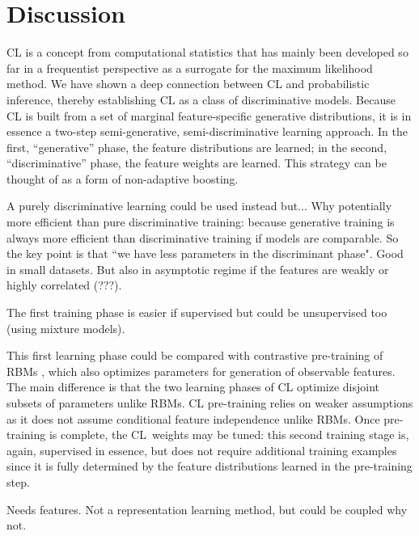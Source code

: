 \documentclass[english]{scrartcl}
\begin{document}
\section{Discussion}
\label{sec:discussion}

CL is a concept from computational statistics that has mainly been developed so far in a frequentist perspective as a surrogate for the maximum likelihood method. We have shown a deep connection between CL and probabilistic inference, thereby establishing CL as a class of discriminative models. Because CL is built from a set of marginal feature-specific generative distributions, it is in essence a two-step semi-generative, semi-discriminative learning approach. In the first, ``generative'' phase, the feature distributions are learned; in the second, ``discriminative'' phase, the feature weights are learned. This strategy can be thought of as a form of non-adaptive boosting.


A purely discriminative learning could be used instead but...
Why potentially more efficient than pure discriminative training: because generative training is always more efficient than discriminative training if models are comparable. So the key point is that ``we have less parameters in the discriminant phase". Good in small datasets. But also in asymptotic regime if the features are weakly or highly correlated (???).

The first training phase is easier if supervised but could be unsupervised too (using mixture models). 

This first learning phase could be compared with contrastive pre-training of RBMs \cite{Hinton-06,Fischer-14}, which also optimizes parameters for generation of observable features. The main difference is that the two learning phases of CL optimize disjoint subsets of parameters unlike RBMs.  CL pre-training relies on weaker assumptions as it does not assume conditional feature independence unlike RBMs. Once pre-training is complete, the CL~weights may be tuned: this second training stage is, again, supervised in essence, but does not require additional training examples since it is fully determined by the feature distributions learned in the pre-training step.

Needs features. Not a representation learning method, but could be coupled why not.


\end{document}
